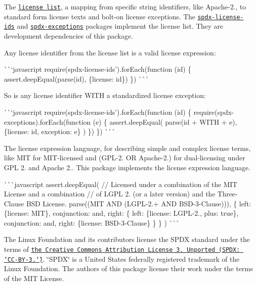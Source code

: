 \begin{DoxyEnumerate}
\item The \href{https://spdx.org/licenses}{\tt license list}, a mapping from specific string identifiers, like {\ttfamily Apache-\/2.}, to standard form license texts and bolt-\/on license exceptions. The \href{https://www.npmjs.com/package/spdx-exceptions}{\tt spdx-\/license-\/ids} and \href{https://www.npmjs.com/package/spdx-license-ids}{\tt spdx-\/exceptions} packages implement the license list. They are development dependencies of this package.

Any license identifier from the license list is a valid license expression\+:

\`{}\`{}`javascript require(\textquotesingle{}spdx-\/license-\/ids').for\+Each(function (id) \{ assert.\+deep\+Equal(parse(id), \{license\+: id\}) \}) \`{}\`{}\`{}

So is any license identifier {\ttfamily W\+I\+TH} a standardized license exception\+:

\`{}\`{}`javascript require(\textquotesingle{}spdx-\/license-\/ids').for\+Each(function (id) \{ require(\textquotesingle{}spdx-\/exceptions\textquotesingle{}).for\+Each(function (e) \{ assert.\+deep\+Equal( parse(id + \textquotesingle{} W\+I\+TH \textquotesingle{} + e), \{license\+: id, exception\+: e\} ) \}) \}) \`{}\`{}\`{}
\item The license expression language, for describing simple and complex license terms, like {\ttfamily M\+IT} for M\+I\+T-\/licensed and {\ttfamily (G\+P\+L-\/2. OR Apache-\/2.)} for dual-\/licensing under G\+PL 2. and Apache 2.. This package implements the license expression language.

\`{}\`{}\`{}javascript assert.\+deep\+Equal( // Licensed under a combination of the M\+IT License and a combination // of L\+G\+PL 2. (or a later version) and the Three-\/\+Clause B\+SD License. parse(\textquotesingle{}(M\+IT A\+ND (L\+G\+P\+L-\/2.+ A\+ND B\+S\+D-\/3-\/\+Clause))\textquotesingle{}), \{ left\+: \{license\+: \textquotesingle{}M\+IT\textquotesingle{}\}, conjunction\+: \textquotesingle{}and\textquotesingle{}, right\+: \{ left\+: \{license\+: \textquotesingle{}L\+G\+P\+L-\/2.\textquotesingle{}, plus\+: true\}, conjunction\+: \textquotesingle{}and\textquotesingle{}, right\+: \{license\+: \textquotesingle{}B\+S\+D-\/3-\/\+Clause\textquotesingle{}\} \} \} ) \`{}\`{}\`{}
\end{DoxyEnumerate}

The Linux Foundation and its contributors license the S\+P\+DX standard under the terms of \href{http://spdx.org/licenses/CC-BY-3.0}{\tt the Creative Commons Attribution License 3. Unported (S\+P\+D\+X\+: \char`\"{}\+C\+C-\/\+B\+Y-\/3.\char`\"{})}. \char`\"{}\+S\+P\+D\+X\char`\"{} is a United States federally registered trademark of the Linux Foundation. The authors of this package license their work under the terms of the M\+IT License. 